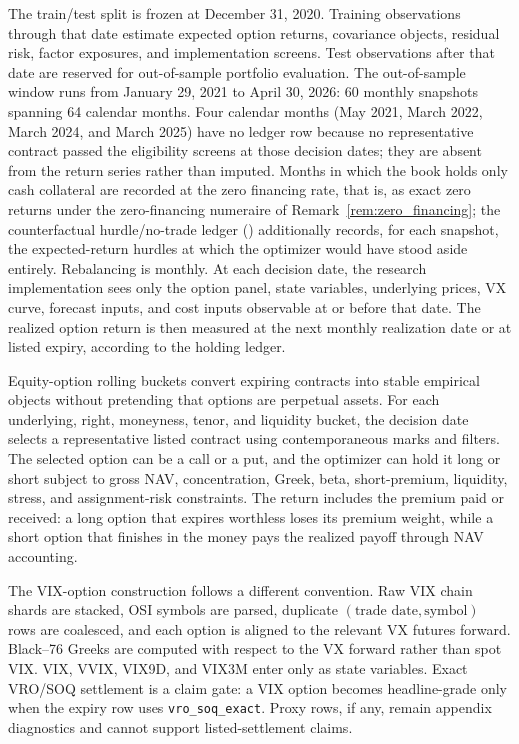 The train/test split is frozen at December 31, 2020. Training observations through that date
estimate expected option returns, covariance objects, residual risk, factor exposures, and
implementation screens. Test observations after that date are reserved for out-of-sample
portfolio evaluation. The out-of-sample window runs from January 29, 2021 to April 30,
2026: 60 monthly snapshots spanning 64 calendar months. Four calendar months (May 2021,
March 2022, March 2024, and March 2025) have no ledger row because no representative
contract passed the eligibility screens at those decision dates; they are absent from the
return series rather than imputed. Months in which the book holds only cash collateral are
recorded at the zero financing rate, that is, as exact zero returns under the
zero-financing numeraire of Remark~\ref{rem:zero_financing}; the counterfactual
hurdle/no-trade ledger () additionally records, for
each snapshot, the expected-return hurdles at which the optimizer would have stood aside
entirely. Rebalancing is monthly. At each decision date, the research implementation sees
only the option panel, state variables, underlying prices, VX curve, forecast inputs, and
cost inputs observable at or before that date. The realized option return is then measured
at the next monthly realization date or at listed expiry, according to the holding ledger.

Equity-option rolling buckets convert expiring contracts into stable empirical objects
without pretending that options are perpetual assets. For each underlying, right,
moneyness, tenor, and liquidity bucket, the decision date selects a representative listed
contract using contemporaneous marks and filters. The selected option can be a call or a
put, and the optimizer can hold it long or short subject to gross NAV, concentration,
Greek, beta, short-premium, liquidity, stress, and assignment-risk constraints. The return
includes the premium paid or received: a long option that expires worthless loses its
premium weight, while a short option that finishes in the money pays the realized payoff
through NAV accounting.

The VIX-option construction follows a different convention. Raw VIX chain shards are
stacked, OSI symbols are parsed, duplicate \((\text{trade date},\text{symbol})\) rows are
coalesced, and each option is aligned to the relevant VX futures forward. Black--76 Greeks
are computed with respect to the VX forward rather than spot VIX. VIX, VVIX, VIX9D, and
VIX3M enter only as state variables. Exact VRO/SOQ settlement is a claim gate: a VIX option
becomes headline-grade only when the expiry row uses \texttt{vro\_soq\_exact}. Proxy rows,
if any, remain appendix diagnostics and cannot support listed-settlement claims.


